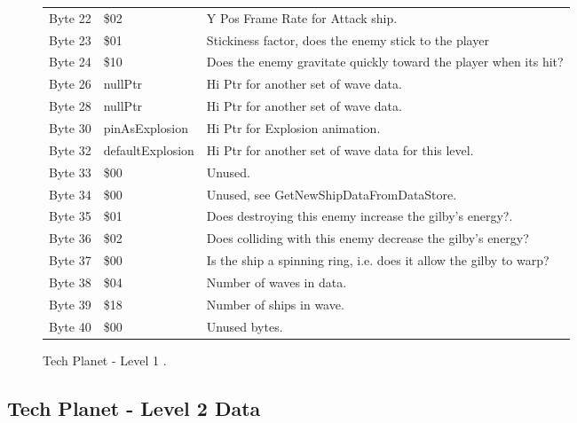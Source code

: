 \begin{figure}[H]
{\begin{adjustbox}{width=12cm}
\begin{tabular}{lll}
 Byte 22 & \$02               & Y Pos Frame Rate for Attack ship.                                  \\
 Byte 23 & \$01               & Stickiness factor, does the enemy stick to the player              \\
 Byte 24 & \$10               & Does the enemy gravitate quickly toward the player when its hit?   \\
 Byte 26 & nullPtr           & Hi Ptr for another set of wave data.                               \\
 Byte 28 & nullPtr           & Hi Ptr for another set of wave data.                               \\
 Byte 30 & pinAsExplosion    & Hi Ptr for Explosion animation.                                    \\
 Byte 32 & defaultExplosion  & Hi Ptr for another set of wave data for this level.                \\
 Byte 33 & \$00               & Unused.                                                            \\
 Byte 34 & \$00               & Unused, see GetNewShipDataFromDataStore.                           \\
 Byte 35 & \$01               & Does destroying this enemy increase the gilby's energy?.           \\
 Byte 36 & \$02               & Does colliding with this enemy decrease the gilby's energy?        \\
 Byte 37 & \$00               & Is the ship a spinning ring, i.e. does it allow the gilby to warp? \\
 Byte 38 & \$04               & Number of waves in data.                                           \\
 Byte 39 & \$18               & Number of ships in wave.                                           \\
 Byte 40 & \$00               & Unused bytes.                                                      \\
\bottomrule
\end{tabular}

  \end{adjustbox}

  }\caption*{Tech Planet - Level 1
.}
\end{figure}

\clearpage
\subsection{Tech Planet - Level 2 Data}

